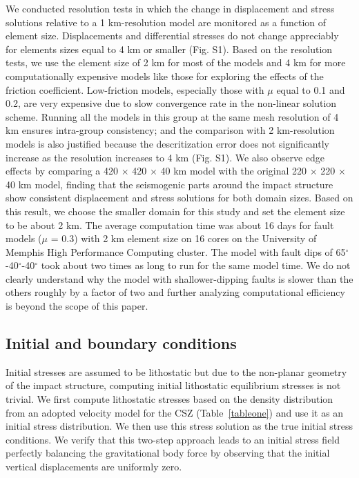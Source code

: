 \documentclass[draft]{agujournal2018}
\begin{document}
We conducted resolution tests in which the change in displacement and stress solutions relative to a 1 km-resolution model are monitored as a function of element size. Displacements and differential stresses do not change appreciably for elements sizes equal to 4 km or smaller (Fig. S1). Based on the resolution tests, we use the element size of 2 km for most of the models and 4 km for more computationally expensive models like those for exploring the effects of the friction coefficient. Low-friction models, especially those with $\mu$ equal to 0.1 and 0.2, are very expensive due to slow convergence rate in the non-linear solution scheme. Running all the models in this group at the same mesh resolution of 4 km ensures intra-group consistency; and the comparison with 2 km-resolution models is also justified because the descritization error does not significantly increase as the resolution increases to 4 km (Fig. S1). We also observe edge effects by comparing a 420 $\times$ 420 $\times$ 40 km model with the original 220 $\times$ 220 $\times$ 40 km model, finding that the seismogenic parts around the impact structure show consistent displacement and stress solutions for both domain sizes. Based on this result, we choose the smaller domain for this study and set the element size to be about 2 km. The average computation time was about 16 days for fault models ($\mu$ = 0.3) with 2 km element size on 16 cores on the University of Memphis High Performance Computing cluster. The model with fault dips of 65$^\circ$-40$^\circ$-40$^\circ$ took about two times as long to run for the same model time. We do not clearly understand why the model with shallower-dipping faults is slower than the others roughly by a factor of two and further analyzing computational efficiency is beyond the scope of this paper.

\subsection{Initial and boundary conditions}
\label{Initial_and_boundary_conditions}
Initial stresses are assumed to be lithostatic but due to the non-planar geometry of the impact structure, computing initial lithostatic equilibrium stresses is not trivial. We first compute lithostatic stresses based on the density distribution from an adopted velocity model for the CSZ (Table~\ref{tableone}) and use it as an initial stress distribution. We then use this stress solution as the true initial stress conditions. We verify that this two-step approach leads to an initial stress field perfectly balancing the gravitational body force by observing that the initial vertical displacements are uniformly zero.
\end{document}
